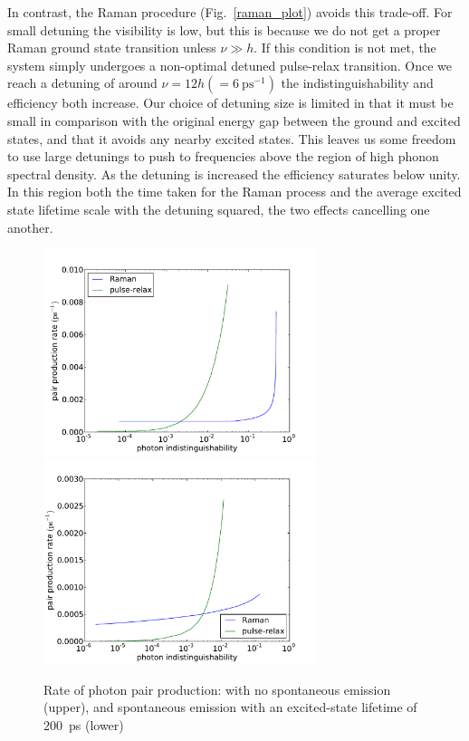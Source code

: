 In contrast, the Raman procedure (Fig.~\ref{raman_plot}) avoids this trade-off. For small detuning the visibility is low, but this is because we do not get a proper Raman ground state transition unless $\nu \gg h$. If this condition is not met, the system simply undergoes a non-optimal detuned pulse-relax transition. Once we reach a detuning of around $\nu = 12h (= 6~\mathrm{ps}^{-1})$ the indistinguishability and efficiency both  increase. Our choice of detuning size is limited in that it must be small in comparison with the original energy gap between the ground and excited states, and that it avoids any nearby excited states. This leaves us some freedom to use large detunings to push to frequencies above the region of high phonon spectral density. As the detuning is increased the efficiency saturates below unity. In this region both the time taken for the Raman process and the average excited state lifetime scale with the detuning squared, the two effects cancelling one another.

\begin{figure}[htb]
  \begin{center}
  \includegraphics[width=8cm]{assets/no_spont_prod_rate.pdf}
  \includegraphics[width=8cm]{assets/rate_of_production_plot.pdf}
  \end{center}
  \caption{Rate of photon pair production: with no spontaneous emission (upper), and spontaneous emission with an excited-state lifetime of $200$~ps (lower)}
  \label{rate_of_production_plot}
\end{figure}

